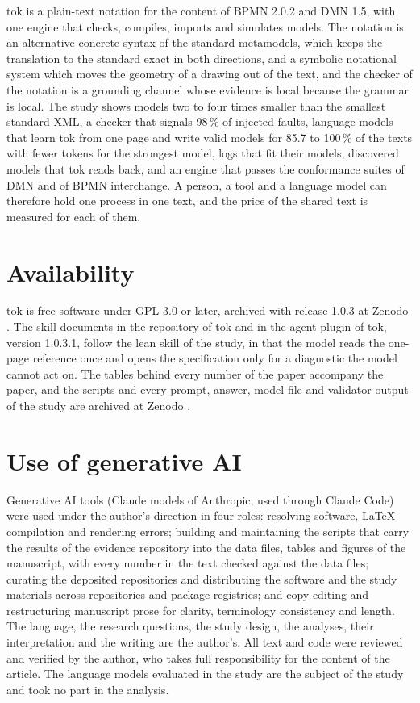\documentclass[11pt,a4paper]{article}
\begin{document}
tok is a plain-text notation for the content of BPMN 2.0.2 and DMN 1.5, with one engine that checks, compiles, imports and simulates models. The notation is an alternative concrete syntax of the standard metamodels, which keeps the translation to the standard exact in both directions, and a symbolic notational system which moves the geometry of a drawing out of the text, and the checker of the notation is a grounding channel whose evidence is local because the grammar is local. The study shows models two to four times smaller than the smallest standard XML, a checker that signals 98\,\% of injected faults, language models that learn tok from one page and write valid models for 85.7 to 100\,\% of the texts with fewer tokens for the strongest model, logs that fit their models, discovered models that tok reads back, and an engine that passes the conformance suites of DMN and of BPMN interchange. A person, a tool and a language model can therefore hold one process in one text, and the price of the shared text is measured for each of them.

\section*{Availability}

tok is free software under GPL-3.0-or-later, archived with release 1.0.3 at Zenodo \citep{Deja2026tok}. The skill documents in the repository of tok and in the agent plugin of tok, version 1.0.3.1, follow the lean skill of the study, in that the model reads the one-page reference once and opens the specification only for a diagnostic the model cannot act on. The tables behind every number of the paper accompany the paper, and the scripts and every prompt, answer, model file and validator output of the study are archived at Zenodo \citep{Deja2026evidence}.

\section*{Use of generative AI}

Generative AI tools (Claude models of Anthropic, used through Claude Code) were used under the author's direction in four roles: resolving software, \LaTeX{} compilation and rendering errors; building and maintaining the scripts that carry the results of the evidence repository into the data files, tables and figures of the manuscript, with every number in the text checked against the data files; curating the deposited repositories and distributing the software and the study materials across repositories and package registries; and copy-editing and restructuring manuscript prose for clarity, terminology consistency and length. The language, the research questions, the study design, the analyses, their interpretation and the writing are the author's. All text and code were reviewed and verified by the author, who takes full responsibility for the content of the article. The language models evaluated in the study are the subject of the study and took no part in the analysis.




\end{document}
